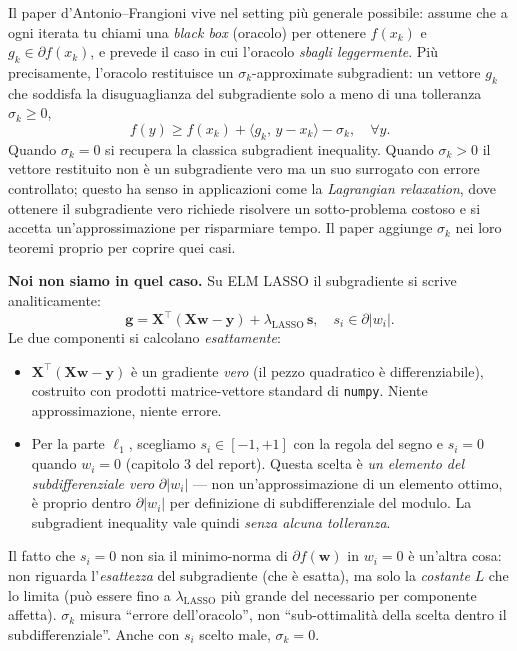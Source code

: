 \documentclass[11pt,a4paper]{article}
\newcommand{\inner}[2]{\langle #1,\,#2\rangle}
\newcommand{\bw}{\mathbf{w}}
\newcommand{\bg}{\mathbf{g}}
\newcommand{\by}{\mathbf{y}}
\newcommand{\bX}{\mathbf{X}}
\newcommand{\bs}{\mathbf{s}}
\theoremstyle{definition}
\begin{document}
\begin{tcolorbox}[intuition,title=Perché $\sigma_k = 0$? (cosa è ``oracolo esatto'')]
Il paper d'Antonio--Frangioni vive nel setting più generale possibile: assume che a ogni iterata tu chiami una \emph{black box} (oracolo) per ottenere $f(x_k)$ e $g_k \in \partial f(x_k)$, e prevede il caso in cui l'oracolo \emph{sbagli leggermente}. Più precisamente, l'oracolo restituisce un $\sigma_k$-approximate subgradient: un vettore $g_k$ che soddisfa la disuguaglianza del subgradiente solo a meno di una tolleranza $\sigma_k \ge 0$,
\[
f(y) \ge f(x_k) + \inner{g_k}{y - x_k} - \sigma_k, \quad \forall y.
\]
Quando $\sigma_k = 0$ si recupera la classica subgradient inequality. Quando $\sigma_k > 0$ il vettore restituito non è un subgradiente vero ma un suo surrogato con errore controllato; questo ha senso in applicazioni come la \emph{Lagrangian relaxation}, dove ottenere il subgradiente vero richiede risolvere un sotto-problema costoso e si accetta un'approssimazione per risparmiare tempo. Il paper aggiunge $\sigma_k$ nei loro teoremi proprio per coprire quei casi.

\textbf{Noi non siamo in quel caso.} Su ELM LASSO il subgradiente si scrive analiticamente:
\[
\bg = \bX^\top(\bX\bw - \by) + \lambda_{\mathrm{LASSO}}\,\bs, \quad s_i \in \partial|w_i|.
\]
Le due componenti si calcolano \emph{esattamente}:
\begin{itemize}[leftmargin=*]
\item $\bX^\top(\bX\bw - \by)$ è un gradiente \emph{vero} (il pezzo quadratico è differenziabile), costruito con prodotti matrice-vettore standard di \texttt{numpy}. Niente approssimazione, niente errore.
\item Per la parte $\ell_1$, scegliamo $s_i \in [-1, +1]$ con la regola del segno e $s_i = 0$ quando $w_i = 0$ (capitolo 3 del report). Questa scelta è \emph{un elemento del subdifferenziale vero} $\partial|w_i|$ --- non un'approssimazione di un elemento ottimo, è proprio dentro $\partial|w_i|$ per definizione di subdifferenziale del modulo. La subgradient inequality vale quindi \emph{senza alcuna tolleranza}.
\end{itemize}
Il fatto che $s_i = 0$ non sia il minimo-norma di $\partial f(\bw)$ in $w_i = 0$ è un'altra cosa: non riguarda l'\emph{esattezza} del subgradiente (che è esatta), ma solo la \emph{costante} $L$ che lo limita (può essere fino a $\lambda_{\mathrm{LASSO}}$ più grande del necessario per componente affetta). $\sigma_k$ misura ``errore dell'oracolo'', non ``sub-ottimalità della scelta dentro il subdifferenziale''. Anche con $s_i$ scelto male, $\sigma_k = 0$.


\end{tcolorbox}
\end{document}
